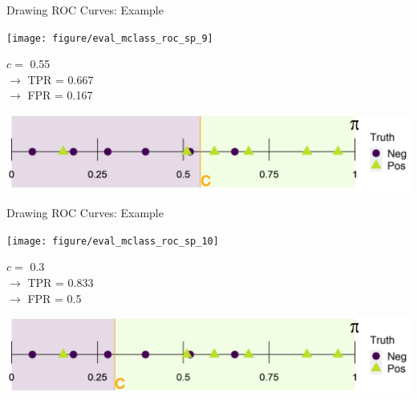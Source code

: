 
\begin{vbframe}{Drawing ROC Curves: Example}
	
	\begin{knitrout}\scriptsize
		\color{fgcolor}
		
		{
			\texttt{[image: figure/eval\_mclass\_roc\_sp\_9]}
		}
		
	\end{knitrout}
	
	\vfill
	
	\begin{minipage}[b]{0.3\textwidth}
		$c =$ 0.55\\ 
		$\rightarrow$ TPR = 0.667 \\
		$\rightarrow$ FPR = 0.167
	\end{minipage}%
	\begin{minipage}[b]{0.7\textwidth}
		\includegraphics{figure/roc_horizontal_step_5} 
	\end{minipage}
	
\end{vbframe}


\begin{vbframe}{Drawing ROC Curves: Example}
	
	\begin{knitrout}\scriptsize
		\color{fgcolor}
		
		{
			\texttt{[image: figure/eval\_mclass\_roc\_sp\_10]} 
		}
		
	\end{knitrout}
	
	\vfill
	
	\begin{minipage}[b]{0.3\textwidth}
		$c =$ 0.3\\ 
		$\rightarrow$ TPR = 0.833 \\
		$\rightarrow$ FPR = 0.5
	\end{minipage}%
	\begin{minipage}[b]{0.7\textwidth}
		\includegraphics{figure/roc_horizontal_step_6} 
	\end{minipage}
	
\end{vbframe}

